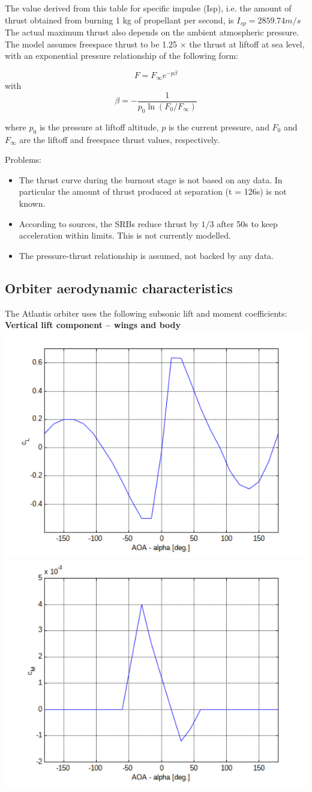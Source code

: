 The value derived from this table for specific impulse (Isp), i.e. the amount of thrust obtained from burning 1 kg of propellant per second, is
$I_{sp} = 2859.74 m/s$
The actual maximum thrust also depends on the ambient atmospheric pressure. The model assumes freespace thrust to be 1.25 × the thrust at liftoff at sea level, with an exponential pressure relationship of the following form:
\begin{center}
\[F = F_\infty e^{-p\beta}\] with \[\beta = -\frac{1}{p_0\ln{(F_0/F_\infty)}}\]
\end{center}
where $p_0$ is the pressure at liftoff altitude, $p$ is the current pressure, and $F_0$ and $F_\infty$ are the liftoff and freespace thrust values, respectively.

Problems:
\begin{itemize} 
\item The thrust curve during the burnout stage is not based on any data. In particular the amount of thrust produced at separation (t = 126s) is not known.
\item According to sources, the SRBs reduce thrust by $1/3$ after 50s to keep acceleration within limits. This is not currently modelled.
\item The pressure-thrust relationship is assumed, not backed by any data.
\end{itemize} 

\subsection{Orbiter aerodynamic characteristics}
The Atlantis orbiter uses the following subsonic lift and moment coefficients:\\

\textbf{\large Vertical lift component – wings and body}\\

\includegraphics[width=0.5\linewidth]{Images//Pic14.pdf}
\includegraphics[width=0.5\linewidth]{Images//Pic15.pdf}

